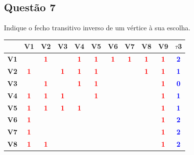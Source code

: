 \documentclass{report}
\begin{document}
\subsection{Questão 7}
Indique o fecho transitivo inverso de um vértice à sua escolha.\\
\cite{overleaf_1}

\begin{table}[h]
    \centering
     \begin{tabular}{|c|c|c|c|c|c|c|c|c|c|c|}
        \hline
         & \textbf{V1} & \textbf{V2} & \textbf{V3} & \textbf{V4} & \textbf{V5} & \textbf{V6} & \textbf{V7} & \textbf{V8} & \textbf{V9} & \textit{\textbf{$\tau$}}3 \\
        \hline 
        \textbf{V1} &  & \textbf{\textcolor{red}{1}} &  & \textbf{\textcolor{red}{1}} & \textbf{\textcolor{red}{1}} & \textbf{\textcolor{red}{1}} & \textbf{\textcolor{red}{1}} & \textbf{\textcolor{red}{1}} & \textbf{\textcolor{red}{1}} & \textbf{\textcolor{blue}{2}}\\ 
        \hline
       \textbf{V2} & \textbf{\textcolor{red}{1}} &  & \textbf{\textcolor{red}{1}} & \textbf{\textcolor{red}{1}} & \textbf{\textcolor{red}{1}} &  &  & \textbf{\textcolor{red}{1}} & \textbf{\textcolor{red}{1}} & \textbf{\textcolor{blue}{1}} \\
        \hline
       \textbf{V3} &  & \textbf{\textcolor{red}{1}} &  & \textbf{\textcolor{red}{1}} & \textbf{\textcolor{red}{1}} &  &  &  & \textbf{\textcolor{red}{1}} & \textbf{\textcolor{blue}{0}}\\
        \hline
       \textbf{V4} & \textbf{\textcolor{red}{1}} & \textbf{\textcolor{red}{1}} & \textbf{\textcolor{red}{1}} &  & \textbf{\textcolor{red}{1}} &  &  &  & \textbf{\textcolor{red}{1}} & \textbf{\textcolor{blue}{1}}\\
        \hline
        \textbf{V5} & \textbf{\textcolor{red}{1}} & \textbf{\textcolor{red}{1}} & \textbf{\textcolor{red}{1}} & \textbf{\textcolor{red}{1}} &  &  &  &  & \textbf{\textcolor{red}{1}} & \textbf{\textcolor{blue}{1}}\\
        \hline
        \textbf{V6} & \textbf{\textcolor{red}{1}} &  &  &  &  &  &  &  & \textbf{\textcolor{red}{1}} & \textbf{\textcolor{blue}{2}}\\
        \hline
        \textbf{V7} & \textbf{\textcolor{red}{1}} &  &  &  &  &  &  &  & \textbf{\textcolor{red}{1}} & \textbf{\textcolor{blue}{2}}  \\
        \hline
        \textbf{V8} & \textbf{\textcolor{red}{1}} & \textbf{\textcolor{red}{1}} &  &  &  &  &  &  & \textbf{\textcolor{red}{1}} & \textbf{\textcolor{blue}{2}} \\

\end{tabular}
\end{table}
\end{document}
